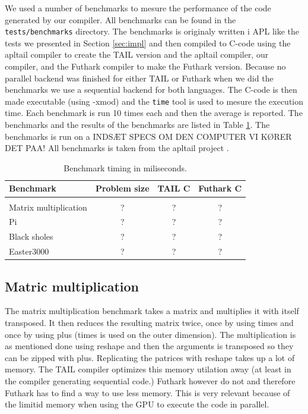 \documentclass[11pt]{article}
\begin{document}
We used a number of benchmarks to mesure the performance of the code generated by our compiler. 
All benchmarks can be found in the {\tt tests/benchmarks} directory. 
The benchmarks is originaly written i APL like the tests we presented in Section \ref{sec:impl} and then compiled to C-code using the apltail compiler to create the TAIL version and the apltail compiler, our compiler, and the Futhark compiler to make the Futhark version. 
Because no parallel backend was finished for either TAIL or Futhark when we did the benchmarks we use a sequential backend for both languages. 
The C-code is then made executable (using -xmod) and the {\tt time} tool is used to mesure the execution time. Each benchmark is run 10 times each and then the average is reported. The benchmarks and the results of the benchmarks are listed in Table \ref{tbl:benchmark}.
The benchmarks is run on a INDSÆT SPECS OM DEN COMPUTER VI KØRER DET PAA! All benchmarks is taken from the apltail project \cite{ElsmanDybdal:Array:2014}.

\begin{table} 
\begin{center}
\label{tbl:benchmark}
\begin{tabular}{l c c c}
Benchmark & Problem size & TAIL C & Futhark C \\ \hline \\
Matrix multiplication    & ? & ? & ? \\
Pi			         & ? & ? & ? \\
Black sholes               & ? & ? & ? \\
Easter3000                 & ? & ? & ? \\
\end{tabular}
\caption{Benchmark timing in miliseconds.}
\end{center}
\end{table}


\subsection{Matric multiplication}
The matrix multiplication benchmark takes a matrix and multiplies it with itself transposed. It then reduces the resulting matrix twice, once by using times and once by using plus (times is used on the outer dimension).
The multiplication is as mentioned done using reshape and then the arguments is transposed so they can be zipped with plus. Replicating the patrices with reshape takes up a lot of memory. The TAIL compiler optimizes this memory utilation away (at least in the compiler generating sequential code.) Futhark however do not and therefore Futhark has to find a way to use less memory. This is very relevant because of the limitid memory when using the GPU to execute the code in parallel. 
\end{document}
